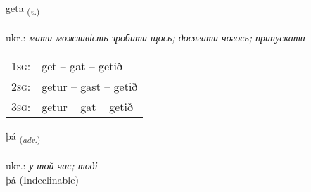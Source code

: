 \documentclass[frontgrid, backgrid]{flacards}\usepackage[]{graphicx}\usepackage[]{xcolor}
\begin{document}
\renewcommand{\flhead}{\vskip5pt \fboxsep=0pt {\small\bfseries\footnotesize Sagnorð | дієслово}}
\renewcommand{\fcfoot}{\vskip5pt \fboxsep=0pt \hspace{2pt}{\small\bfseries\footnotesize 1K}}

\renewcommand{\blhead}{\vskip5pt {\small\bfseries\footnotesize Sagnorð | дієслово }}
\renewcommand{\bcfoot}{\vskip5pt \hspace{2pt}{\small\bfseries\footnotesize 1K}}


{geta \small{\textsubscript{(\textit{v.})}} \\[1ex] %
\textphonetic{[cɛːta]} \\
ukr.: \emph{мати можливість зробити щось; досягати чогось; припускати} \\  [2ex]
\renewcommand*{\arraystretch}{0.8}
\begin{tabular}{p{1cm}l}
\textsc{1sg}: & get -- gat -- getið \\ 
\textsc{2sg}: & getur -- gast -- getið \\ 
\textsc{3sg}: & getur -- gat -- getið \\ 
\end{tabular}
}


\renewcommand{\flhead}{\vskip5pt \fboxsep=0pt {\small\bfseries\footnotesize Atviksorð | прислівник}}
\renewcommand{\fcfoot}{\vskip5pt \fboxsep=0pt \hspace{2pt}{\small\bfseries\footnotesize 1K}}

\renewcommand{\blhead}{\vskip5pt {\small\bfseries\footnotesize Atviksorð | прислівник }}
\renewcommand{\bcfoot}{\vskip5pt \hspace{2pt}{\small\bfseries\footnotesize 1K}}


{þá \small{\textsubscript{(\textit{adv.})}} \\[1ex]
\textphonetic{[θauː]} \\
ukr.: \emph{у той час; тоді} \\  [2ex]
þá (Indeclinable)}
\end{document}
